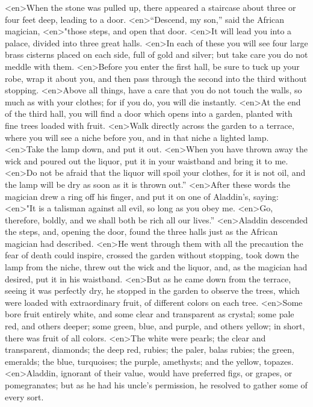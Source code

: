 <en>When the stone was pulled up, there appeared a staircase about three or four feet deep, leading to a door.
<en>“Descend, my son,” said the African magician,
<en>"those steps, and open that door.
<en>It will lead you into a palace, divided into three great halls.
<en>In each of these you will see four large brass cisterns placed on each side, full of gold and silver; but take care you do not meddle with them.
<en>Before you enter the first hall, be sure to tuck up your robe, wrap it about you, and then pass through the second into the third without stopping.
<en>Above all things, have a care that you do not touch the walls, so much as with your clothes; for if you do, you will die instantly.
<en>At the end of the third hall, you will find a door which opens into a garden, planted with fine trees loaded with fruit.
<en>Walk directly across the garden to a terrace, where you will see a niche before you, and in that niche a lighted lamp.
<en>Take the lamp down, and put it out.
<en>When you have thrown away the wick and poured out the liquor, put it in your waistband and bring it to me.
<en>Do not be afraid that the liquor will spoil your clothes, for it is not oil, and the lamp will be dry as soon as it is thrown out.”
<en>After these words the magician drew a ring off his finger, and put it on one of Aladdin’s, saying:
<en>"It is a talisman against all evil, so long as you obey me.
<en>Go, therefore, boldly, and we shall both be rich all our lives.”
<en>Aladdin descended the steps, and, opening the door, found the three halls just as the African magician had described.
<en>He went through them with all the precaution the fear of death could inspire, crossed the garden without stopping, took down the lamp from the niche, threw out the wick and the liquor, and, as the magician had desired, put it in his waistband.
<en>But as he came down from the terrace, seeing it was perfectly dry, he stopped in the garden to observe the trees, which were loaded with extraordinary fruit, of different colors on each tree.
<en>Some bore fruit entirely white, and some clear and transparent as crystal; some pale red, and others deeper; some green, blue, and purple, and others yellow; in short, there was fruit of all colors.
<en>The white were pearls; the clear and transparent, diamonds; the deep red, rubies; the paler, balas rubies; the green, emeralds; the blue, turquoises; the purple, amethysts; and the yellow, topazes.
<en>Aladdin, ignorant of their value, would have preferred figs, or grapes, or pomegranates; but as he had his uncle’s permission, he resolved to gather some of every sort.
